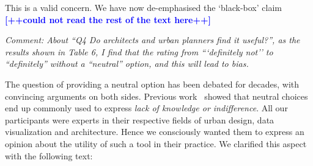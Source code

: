 \documentclass{paper}
\newenvironment{myquote}
{\definecolor{shadecolor}{rgb}{0.9,0.95,1} \begin{shaded*} \sf \em}
{\em\end{shaded*}}
\begin{document}
\noindent This is a valid concern. We have now de-emphasised the `black-box' claim \textcolor{blue}{\textbf{[++could not read the rest of the text here++]}}


\begin{myquote}
\noindent Comment: About ``Q4 Do architects and urban planners find it useful?'', as the results shown in Table 6, I find that the rating from ```definitely not'' to ``definitely'' without a ``neutral'' option, and this will lead to bias.
\end{myquote}

\noindent The question of providing a neutral option has been debated for decades, with convincing arguments on both sides. Previous work~\cite{Agree2012,moors2008exploring} showed that neutral choices end up commonly used to express \textit{lack of knowledge or indifference}. All our participants were experts in their respective fields of urban design, data visualization and architecture. Hence we consciously wanted them to express an opinion about the utility of such a tool in their practice. We clarified this aspect with the following text:
\end{document}

